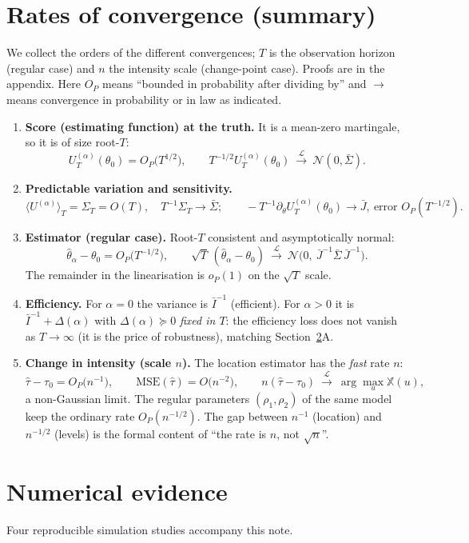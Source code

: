 \documentclass[smallextended,natbib]{svjour3}
\newcommand{\toL}{\xrightarrow{\mathcal{L}}}
\begin{document}
\section{Rates of convergence (summary)}
\label{sec:rates}
We collect the orders of the different convergences; $T$ is the observation
horizon (regular case) and $n$ the intensity scale (change-point case). Proofs are
in the appendix. Here $O_P$ means ``bounded in probability after dividing by'' and
$\to$ means convergence in probability or in law as indicated.

\begin{enumerate}
\item \textbf{Score (estimating function) at the truth.} It is a mean-zero
martingale, so it is of size root-$T$:
\[
U_T^{(\alpha)}(\theta_0)=O_P\!\big(T^{1/2}\big),\qquad
T^{-1/2}U_T^{(\alpha)}(\theta_0)\ \toL\ \mathcal N(0,\bar\Sigma).
\]
\item \textbf{Predictable variation and sensitivity.}
\[
\langle U^{(\alpha)}\rangle_T=\Sigma_T=O(T),\quad T^{-1}\Sigma_T\to\bar\Sigma;
\qquad -T^{-1}\partial_\theta U_T^{(\alpha)}(\theta_0)\to\bar J,\ \text{error }O_P(T^{-1/2}).
\]
\item \textbf{Estimator (regular case).} Root-$T$ consistent and asymptotically
normal:
\[
\hat\theta_\alpha-\theta_0=O_P\!\big(T^{-1/2}\big),\qquad
\sqrt T\,(\hat\theta_\alpha-\theta_0)\ \toL\ \mathcal N\!\big(0,\ \bar J^{-1}\bar\Sigma\,\bar J^{-1}\big).
\]
The remainder in the linearisation is $o_P(1)$ on the $\sqrt T$ scale.
\item \textbf{Efficiency.} For $\alpha=0$ the variance is $\bar I^{-1}$ (efficient).
For $\alpha>0$ it is $\bar I^{-1}+\Delta(\alpha)$ with $\Delta(\alpha)\succeq0$
\emph{fixed in $T$}: the efficiency loss does not vanish as $T\to\infty$ (it is the
price of robustness), matching Section~\ref{sec:num}A.
\item \textbf{Change in intensity (scale $n$).} The location estimator has the
\emph{fast} rate $n$:
\[
\hat\tau-\tau_0=O_P\!\big(n^{-1}\big),\qquad \mathrm{MSE}(\hat\tau)=O\!\big(n^{-2}\big),
\qquad n(\hat\tau-\tau_0)\ \toL\ \arg\max_u \mathbb X(u),
\]
a non-Gaussian limit. The regular parameters $(\rho_1,\rho_2)$ of the same model
keep the ordinary rate $O_P(n^{-1/2})$. The gap between $n^{-1}$ (location) and
$n^{-1/2}$ (levels) is the formal content of ``the rate is $n$, not $\sqrt n$''.
\end{enumerate}

\section{Numerical evidence}
\label{sec:num}
Four reproducible simulation studies accompany this note.
\end{document}
